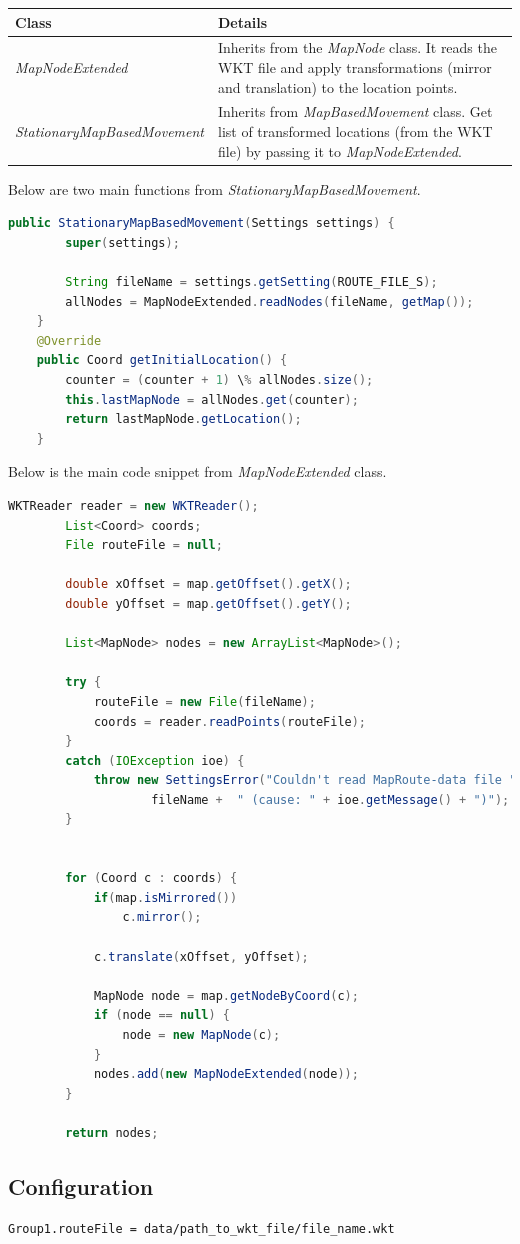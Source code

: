 	\begin{center}
	    \begin{tabular}{ | l | p{8.8cm} |}
    		\hline
    		\textbf{Class} & \textbf{Details} \\ \hline
    		\textit{MapNodeExtended} & Inherits from the \textit{MapNode} class. It reads the WKT file and apply transformations (mirror and translation) to the location points. \\ \hline
    		\textit{StationaryMapBasedMovement} & Inherits from \textit{MapBasedMovement} class. Get list of transformed locations (from the WKT file) by passing it to \textit{MapNodeExtended}. \\ \hline
    	\end{tabular}
    	 \label{tab:wktMapFiles}

	\end{center}
\newpage
Below are two main functions from \textit{StationaryMapBasedMovement}.
\vspace{3mm}
\begin{lstlisting}[language=java]
	public StationaryMapBasedMovement(Settings settings) {
		super(settings);

		String fileName = settings.getSetting(ROUTE_FILE_S);
		allNodes = MapNodeExtended.readNodes(fileName, getMap());
	}
	@Override
	public Coord getInitialLocation() {
		counter = (counter + 1) \% allNodes.size();
		this.lastMapNode = allNodes.get(counter);
		return lastMapNode.getLocation();
	}
\end{lstlisting}

\vspace{10mm}
Below is the main code snippet from \textit{MapNodeExtended} class.
\vspace{3mm}
\begin{lstlisting}[language=java]
		WKTReader reader = new WKTReader();
		List<Coord> coords;
		File routeFile = null;

		double xOffset = map.getOffset().getX();
		double yOffset = map.getOffset().getY();

		List<MapNode> nodes = new ArrayList<MapNode>();

		try {
			routeFile = new File(fileName);
			coords = reader.readPoints(routeFile);
		}
		catch (IOException ioe) {
			throw new SettingsError("Couldn't read MapRoute-data file " +
					fileName + 	" (cause: " + ioe.getMessage() + ")");
		}


		for (Coord c : coords) {
			if(map.isMirrored())
				c.mirror();

			c.translate(xOffset, yOffset);

			MapNode node = map.getNodeByCoord(c);
			if (node == null) {
				node = new MapNode(c);
			}
			nodes.add(new MapNodeExtended(node));
		}

		return nodes;
\end{lstlisting}
\vspace{8mm}
\subsection{Configuration}
\begin{lstlisting}[language=bash]
Group1.routeFile = data/path_to_wkt_file/file_name.wkt
\end{lstlisting}
